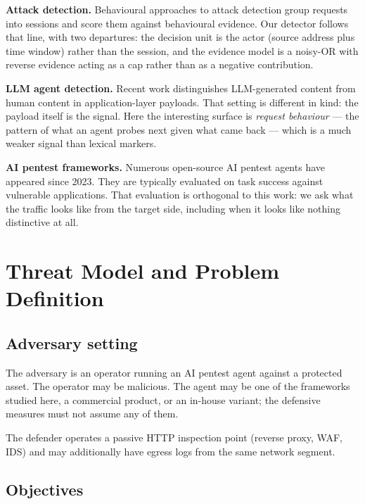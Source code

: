 \documentclass[11pt]{article}
\begin{document}
\textbf{Attack detection.} Behavioural approaches to attack detection group requests into
sessions and score them against behavioural evidence. Our detector follows that line, with two
departures: the decision unit is the actor (source address plus time window) rather than the
session, and the evidence model is a noisy-OR with reverse evidence acting as a cap rather than
as a negative contribution.

\textbf{LLM agent detection.} Recent work distinguishes LLM-generated content from human
content in application-layer payloads. That setting is different in kind: the payload itself is
the signal. Here the interesting surface is \emph{request behaviour} --- the pattern of what an
agent probes next given what came back --- which is a much weaker signal than lexical markers.

\textbf{AI pentest frameworks.} Numerous open-source AI pentest agents have appeared since 2023.
They are typically evaluated on task success against vulnerable applications. That evaluation
is orthogonal to this work: we ask what the traffic looks like from the target side, including
when it looks like nothing distinctive at all.

\section{Threat Model and Problem Definition}
\label{sec:threat}

\subsection{Adversary setting}
\label{sec:adversary}

The adversary is an operator running an AI pentest agent against a protected asset. The
operator may be malicious. The agent may be one of the frameworks studied here, a commercial
product, or an in-house variant; the defensive measures must not assume any of them.

The defender operates a passive HTTP inspection point (reverse proxy, WAF, IDS) and may
additionally have egress logs from the same network segment.

\subsection{Objectives}
\label{sec:objectives}
\end{document}
